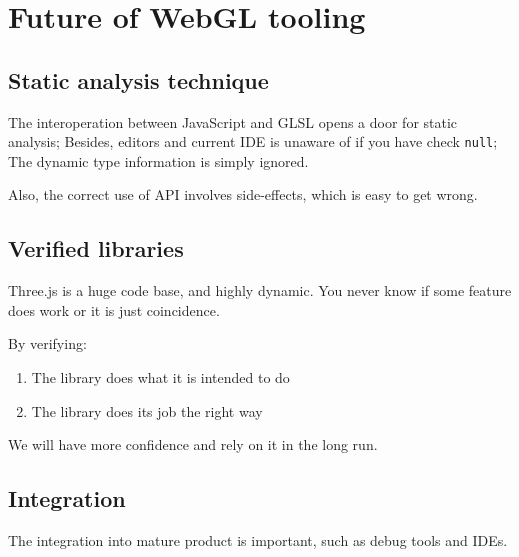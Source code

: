 \section{Future of WebGL tooling}\label{future-of-webgl-tooling}

\subsection{Static analysis technique}\label{static-analysis-technique}

The interoperation between JavaScript and GLSL opens a door for static
analysis; Besides, editors and current IDE is unaware of if you have
check \texttt{null}; The dynamic type information is simply ignored.

Also, the correct use of API involves side-effects, which is easy to get
wrong.

\subsection{Verified libraries}\label{verified-libraries}

Three.js is a huge code base, and highly dynamic. You never know if some
feature does work or it is just coincidence.

By verifying:

\begin{enumerate}
\def\labelenumi{\arabic{enumi}.}
\tightlist
\item
  The library does what it is intended to do
\item
  The library does its job the right way
\end{enumerate}

We will have more confidence and rely on it in the long run.

\subsection{Integration}\label{integration}

The integration into mature product is important, such as debug tools
and IDEs.
